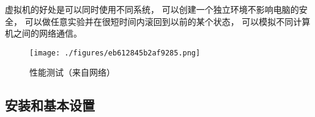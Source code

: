 
\begin{issues}
\issueDraft
\end{issues}

虚拟机的好处是可以同时使用不同系统， 可以创建一个独立环境不影响电脑的安全， 可以做任意实验并在很短时间内滚回到以前的某个状态， 可以模拟不同计算机之间的网络通信。

\begin{figure}[ht]
\centering
\texttt{[image: ./figures/eb612845b2af9285.png]}
\caption{性能测试（来自网络）} \label{fig_VirBox_1}
\end{figure}

\subsection{安装和基本设置}

